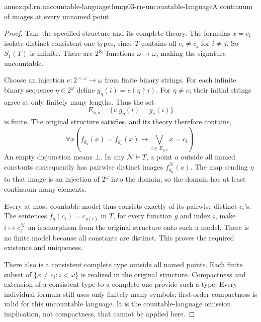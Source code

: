 \begin{annexitem}{annex:p3.rn.uncountable-language}{thm:p03-rn-uncountable-language}{A continuum of images at every unnamed point}
\begin{proof}
Take the specified structure and its complete theory.
The formulas \(x=c_i\) isolate distinct consistent
one-types, since \(T\) contains all
\(c_i\ne c_j\) for \(i\ne j\).
So \(S_1(T)\) is infinite.
There are \(2^{\aleph_0}\) functions \(\omega\to\omega\),
making the signature uncountable.

Choose an injection \(e:2^{<\omega}\to\omega\)
from finite binary strings.
For each infinite binary sequence \(\eta\in2^\omega\)
define \(g_\eta(i)=e(\eta\upharpoonright i)\).
For \(\eta\ne\nu\), their initial strings agree
at only finitely many lengths. Thus the set
\[
 E_{\eta,\nu}=\{i:g_\eta(i)=g_\nu(i)\}
\]
is finite. The original structure satisfies, and its
theory therefore contains,
\[
 \forall x\left(f_{g_\eta}(x)=f_{g_\nu}(x)\to
                  \bigvee_{i\in E_{\eta,\nu}}x=c_i\right).
\]
An empty disjunction means \(\bot\).
In any \(\mathcal N\models T\), a point \(a\) outside
all named constants consequently has pairwise distinct
images \(f_{g_\eta}^{\mathcal N}(a)\).
The map sending \(\eta\) to that image is an injection
of \(2^\omega\) into the domain, so the domain has at
least continuum many elements.

Every at most countable model thus consists exactly
of its pairwise distinct \(c_i\)'s.
The sentences \(f_g(c_i)=c_{g(i)}\) in \(T\), for every
function \(g\) and index \(i\), make
\(i\mapsto c_i^{\mathcal N}\) an isomorphism from the
original structure onto such a model.
There is no finite model because all constants are distinct.
This proves the required existence and uniqueness.

There also is a consistent complete type outside all
named points. Each finite subset of
\(\{x\ne c_i:i<\omega\}\) is realized in the original
structure. Compactness and extension of a consistent
type to a complete one provide such a type.
Every individual formula still uses only finitely many
symbols; first-order compactness is valid for this
uncountable language. It is the countable-language
omission implication, not compactness, that cannot
be applied here.
\end{proof}
\end{annexitem}

